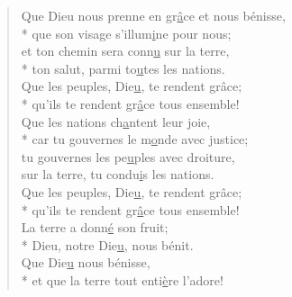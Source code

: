 
\begin{verse}
Que Dieu nous prenne en gr\underline{â}ce et nous bénisse, \\*
que son visage s’illum\underline{i}ne pour nous; \\
et ton chemin sera conn\underline{u} sur la terre, \\*
ton salut, parmi to\underline{u}tes les nations. \\

Que les peuples, Die\underline{u}, te rendent grâce; \\*
qu’ils te rendent gr\underline{â}ce tous ensemble! \\

Que les nations ch\underline{a}ntent leur joie, \\*
car tu gouvernes le m\underline{o}nde avec justice; \\
tu gouvernes les pe\underline{u}ples avec droiture, \\
sur la terre, tu condu\underline{i}s les nations. \\

Que les peuples, Die\underline{u}, te rendent grâce; \\*
qu’ils te rendent gr\underline{â}ce tous ensemble! \\

La terre a donn\underline{é} son fruit; \\*
Dieu, notre Die\underline{u}, nous bénit. \\
Que Die\underline{u} nous bénisse, \\*
et que la terre tout enti\underline{è}re l’adore! \\
\end{verse}

